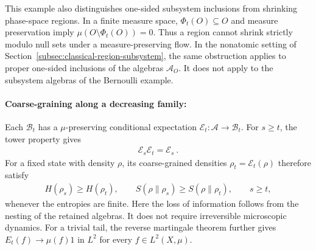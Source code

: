\documentclass[a4paper,11pt]{article}
\theoremstyle{definition}
\newcommand{\mA}{\mathcal{A}}
\newcommand{\mB}{\mathcal{B}}
\begin{document}
This example also distinguishes one-sided subsystem inclusions from shrinking phase-space regions. In a finite measure space, $\Phi_t(O)\subseteq O$ and measure preservation imply $\mu(O\setminus\Phi_t(O))=0$. Thus a region cannot shrink strictly modulo null sets under a measure-preserving flow. In the nonatomic setting of Section~\ref{subsec:classical-region-subsystem}, the same obstruction applies to proper one-sided inclusions of the algebras $\mA_O$. It does not apply to the subsystem algebras of the Bernoulli example.

\paragraph{Coarse-graining along a decreasing family:}
Each $\mB_t$ has a $\mu$-preserving conditional expectation $\mathcal{E}_t:\mA\to\mB_t$. For $s\geq t$, the tower property gives
\begin{align}
    \mathcal{E}_s\mathcal{E}_t=\mathcal{E}_s\ .
\end{align}
For a fixed state with density $\rho$, its coarse-grained densities $\rho_t=\mathcal{E}_t(\rho)$ therefore satisfy
\begin{align}
    H(\rho_s)\geq H(\rho_t),
    \qquad
    S(\rho\|\rho_s)\geq S(\rho\|\rho_t),
    \qquad s\geq t,
\end{align}
whenever the entropies are finite. Here the loss of information follows from the nesting of the retained algebras. It does not require irreversible microscopic dynamics. For a trivial tail, the reverse martingale theorem further gives $E_t(f)\to\mu(f)1$ in $L^2$ for every $f\in L^2(X,\mu)$.


\end{document}
